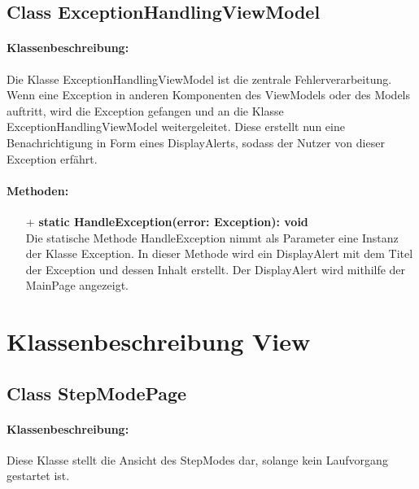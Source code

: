 \documentclass[a4paper,12pt]{article}
\begin{document}
\subsection{Class ExceptionHandlingViewModel}
	\paragraph{Klassenbeschreibung:}
	Die Klasse ExceptionHandlingViewModel ist die zentrale Fehlerverarbeitung. Wenn eine Exception in anderen Komponenten des ViewModels oder des Models auftritt, wird die Exception gefangen und an die Klasse ExceptionHandlingViewModel weitergeleitet. Diese erstellt nun eine Benachrichtigung in Form eines DisplayAlerts, sodass der Nutzer von dieser Exception erfährt. 
	
	\paragraph{Methoden:}
	\begin{itemize}
		\item[+] \textbf{static HandleException(error: Exception): void}\\Die statische Methode HandleException nimmt als Parameter eine Instanz der Klasse Exception. In dieser Methode wird ein DisplayAlert mit dem Titel der Exception und dessen Inhalt erstellt. Der DisplayAlert wird mithilfe der MainPage angezeigt.
	\end{itemize}
\section{Klassenbeschreibung View}


\subsection{Class StepModePage}
\paragraph{Klassenbeschreibung:}
Diese Klasse stellt die Ansicht des StepModes dar, solange kein Laufvorgang gestartet ist.
\end{document}
